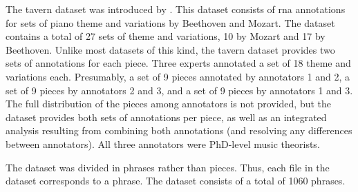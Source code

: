 

The \gls{tavern} dataset was introduced by
\textcite{devaney2015theme}. This dataset consists of
\gls{rna} annotations for sets of piano theme and variations
by Beethoven and Mozart. The dataset contains a total of 27
sets of theme and variations, 10 by Mozart and 17 by
Beethoven. Unlike most datasets of this kind, the
\gls{tavern} dataset provides two sets of annotations for
each piece. Three experts annotated a set of 18 theme and
variations each. Presumably, a set of 9 pieces annotated by
annotators 1 and 2, a set of 9 pieces by annotators 2 and 3,
and a set of 9 pieces by annotators 1 and 3. The full
distribution of the pieces among annotators is not provided,
but the dataset provides both sets of annotations per piece,
as well as an integrated analysis resulting from combining
both annotations (and resolving any differences between
annotators). All three annotators were PhD-level music
theorists.

The dataset was divided in phrases rather than pieces. Thus,
each file in the dataset corresponds to a phrase. The
dataset consists of a total of 1060 phrases.
